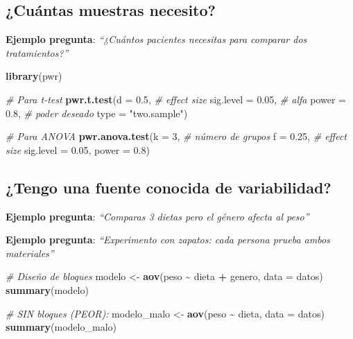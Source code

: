 \documentclass[
  10pt,
]{article}
\newenvironment{Shaded}{\begin{snugshade}}{\end{snugshade}}
\newcommand{\AttributeTok}[1]{\textcolor[rgb]{0.13,0.29,0.53}{#1}}
\newcommand{\CommentTok}[1]{\textcolor[rgb]{0.56,0.35,0.01}{\textit{#1}}}
\newcommand{\DecValTok}[1]{\textcolor[rgb]{0.00,0.00,0.81}{#1}}
\newcommand{\FloatTok}[1]{\textcolor[rgb]{0.00,0.00,0.81}{#1}}
\newcommand{\FunctionTok}[1]{\textcolor[rgb]{0.13,0.29,0.53}{\textbf{#1}}}
\newcommand{\NormalTok}[1]{#1}
\newcommand{\OtherTok}[1]{\textcolor[rgb]{0.56,0.35,0.01}{#1}}
\newcommand{\SpecialCharTok}[1]{\textcolor[rgb]{0.81,0.36,0.00}{\textbf{#1}}}
\newcommand{\StringTok}[1]{\textcolor[rgb]{0.31,0.60,0.02}{#1}}
\begin{document}
\subsection{¿Cuántas muestras
necesito?}\label{cuuxe1ntas-muestras-necesito}

\textbf{Ejemplo pregunta}: \emph{``¿Cuántos pacientes necesitas para
comparar dos tratamientos?''}

\begin{Shaded}
\begin{Highlighting}[]
\FunctionTok{library}\NormalTok{(pwr)}

\CommentTok{\# Para t{-}test}
\FunctionTok{pwr.t.test}\NormalTok{(}\AttributeTok{d =} \FloatTok{0.5}\NormalTok{,           }\CommentTok{\# effect size}
           \AttributeTok{sig.level =} \FloatTok{0.05}\NormalTok{,   }\CommentTok{\# alfa}
           \AttributeTok{power =} \FloatTok{0.8}\NormalTok{,        }\CommentTok{\# poder deseado}
           \AttributeTok{type =} \StringTok{"two.sample"}\NormalTok{)}

\CommentTok{\# Para ANOVA}
\FunctionTok{pwr.anova.test}\NormalTok{(}\AttributeTok{k =} \DecValTok{3}\NormalTok{,          }\CommentTok{\# número de grupos}
               \AttributeTok{f =} \FloatTok{0.25}\NormalTok{,       }\CommentTok{\# effect size}
               \AttributeTok{sig.level =} \FloatTok{0.05}\NormalTok{,}
               \AttributeTok{power =} \FloatTok{0.8}\NormalTok{)}
\end{Highlighting}
\end{Shaded}

\subsection{¿Tengo una fuente conocida de
variabilidad?}\label{tengo-una-fuente-conocida-de-variabilidad}

\textbf{Ejemplo pregunta}: \emph{``Comparas 3 dietas pero el género
afecta al peso''}

\textbf{Ejemplo pregunta}: \emph{``Experimento con zapatos: cada persona
prueba ambos materiales''}

\begin{Shaded}
\begin{Highlighting}[]
\CommentTok{\# Diseño de bloques}
\NormalTok{modelo }\OtherTok{\textless{}{-}} \FunctionTok{aov}\NormalTok{(peso }\SpecialCharTok{\textasciitilde{}}\NormalTok{ dieta }\SpecialCharTok{+}\NormalTok{ genero, }\AttributeTok{data =}\NormalTok{ datos)}
\FunctionTok{summary}\NormalTok{(modelo)}

\CommentTok{\# SIN bloques (PEOR):}
\NormalTok{modelo\_malo }\OtherTok{\textless{}{-}} \FunctionTok{aov}\NormalTok{(peso }\SpecialCharTok{\textasciitilde{}}\NormalTok{ dieta, }\AttributeTok{data =}\NormalTok{ datos)}
\FunctionTok{summary}\NormalTok{(modelo\_malo)}
\end{Highlighting}
\end{Shaded}
\end{document}
